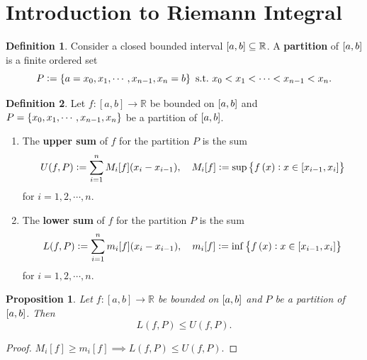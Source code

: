\documentclass[12pt,openany]{book}
\newtheorem{proposition}[theorem]{Proposition}
\theoremstyle{definition}
\newtheorem{definition}{Definition}[chapter]
\newcommand{\R}{\mathbb{R}}
\newcommand{\of}[1]{\left( #1 \right)}
\begin{document}
	\section{Introduction to Riemann Integral}
	\begin{tcolorbox}[colframe=defcolor, title={\color{white}\bf Parition}]
		\begin{definition}
			Consider a closed bounded interval \(\sbr{a,b}\subseteq\R\). A \textbf{partition} of \(\sbr{a,b}\) is a finite ordered set \[
			P:=\set{a=x_0,x_1,\cdots,x_{n-1},x_n=b}\ \text{s.t.}\ x_0<x_1<\cdots<x_{n-1}<x_n.
			\]
		\end{definition}
	\end{tcolorbox}
	\vspace{8pt}
	\begin{tcolorbox}[colframe=defcolor, title={\color{white}\bf Upper and Lower Sum}]
		\begin{definition}
			Let \(f:[a,b]\to\R\) be bounded on \(\sbr{a,b}\) and \(P=\set{x_0,x_1,\cdots,x_{n-1},x_n}\) be a partition of \(\sbr{a,b}\).
			\begin{enumerate}[(1)]
				\item The \textbf{upper sum} of \(f\) for the partition \(P\) is the sum \[
				U(f,P):=\sum_{i=1}^{n}M_i[f](x_i-x_{i-1}),\quad M_i[f]:=\sup\set{f\of{x}:x\in\sbr{x_{i-1},x_i}}
				\] for \(i=1,2,\cdots, n\).
				\item The \textbf{lower sum} of \(f\) for the partition \(P\) is the sum \[
				L(f,P):=\sum_{i=1}^{n}m_i[f](x_i-x_{i-1}),\quad m_i[f]:=\inf\set{f\of{x}:x\in\sbr{x_{i-1},x_i}}
				\] for \(i=1,2,\cdots, n\).
			\end{enumerate}
		\end{definition}
	\end{tcolorbox}
	\begin{tcolorbox}[colframe=procolor, title={\color{white}\bf }]
		\begin{proposition}
			Let \(f:[a,b]\to\R\) be bounded on \(\sbr{a,b}\) and \(P\) be a partition of \(\sbr{a,b}\). Then \[
			L(f,P)\leq U(f,P).
			\]
		\end{proposition}
	\end{tcolorbox}
	\begin{proof}
		\(M_i[f]\geq m_i[f]\implies L(f,P)\leq U(f,P)\).
	\end{proof}
	
\end{document}
